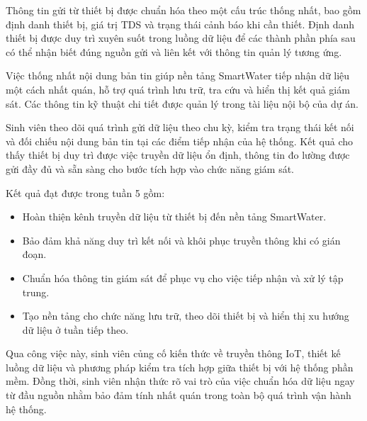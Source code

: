 
Thông tin gửi từ thiết bị được chuẩn hóa theo một cấu trúc thống nhất, bao gồm định danh thiết bị, giá trị TDS và trạng thái cảnh báo khi cần thiết. Định danh thiết bị được duy trì xuyên suốt trong luồng dữ liệu để các thành phần phía sau có thể nhận biết đúng nguồn gửi và liên kết với thông tin quản lý tương ứng.

Việc thống nhất nội dung bản tin giúp nền tảng SmartWater tiếp nhận dữ liệu một cách nhất quán, hỗ trợ quá trình lưu trữ, tra cứu và hiển thị kết quả giám sát. Các thông tin kỹ thuật chi tiết được quản lý trong tài liệu nội bộ của dự án.


Sinh viên theo dõi quá trình gửi dữ liệu theo chu kỳ, kiểm tra trạng thái kết nối và đối chiếu nội dung bản tin tại các điểm tiếp nhận của hệ thống. Kết quả cho thấy thiết bị duy trì được việc truyền dữ liệu ổn định, thông tin đo lường được gửi đầy đủ và sẵn sàng cho bước tích hợp vào chức năng giám sát.


Kết quả đạt được trong tuần 5 gồm:

\begin{itemize}
    \item Hoàn thiện kênh truyền dữ liệu từ thiết bị đến nền tảng SmartWater.
    \item Bảo đảm khả năng duy trì kết nối và khôi phục truyền thông khi có gián đoạn.
    \item Chuẩn hóa thông tin giám sát để phục vụ cho việc tiếp nhận và xử lý tập trung.
    \item Tạo nền tảng cho chức năng lưu trữ, theo dõi thiết bị và hiển thị xu hướng dữ liệu ở tuần tiếp theo.
\end{itemize}

Qua công việc này, sinh viên củng cố kiến thức về truyền thông IoT, thiết kế luồng dữ liệu và phương pháp kiểm tra tích hợp giữa thiết bị với hệ thống phần mềm. Đồng thời, sinh viên nhận thức rõ vai trò của việc chuẩn hóa dữ liệu ngay từ đầu nguồn nhằm bảo đảm tính nhất quán trong toàn bộ quá trình vận hành hệ thống.
